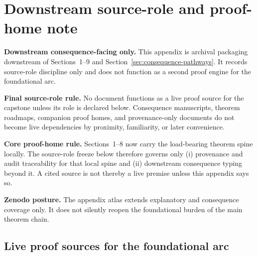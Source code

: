 \section{Downstream source-role and proof-home note}
\label{app:final-source-freeze}

\begin{fixedbox}
\textbf{Downstream consequence-facing only.} This appendix is archival packaging downstream of Sections~1--9 and Section~\ref{sec:consequence-pathways}. It records source-role discipline only and does not function as a second proof engine for the foundational arc.\par\medskip
\textbf{Final source-role rule.} No document functions as a live proof source for the capstone unless its role is declared below. Consequence manuscripts, theorem roadmaps, companion proof homes, and provenance-only documents do not become live dependencies by proximity, familiarity, or later convenience.\par\medskip
\textbf{Core proof-home rule.} Sections~1--8 now carry the load-bearing theorem spine locally. The source-role freeze below therefore governs only (i) provenance and audit traceability for that local spine and (ii) downstream consequence typing beyond it. A cited source is not thereby a live premise unless this appendix says so.\par\medskip
\textbf{Zenodo posture.} The appendix atlas extends explanatory and consequence coverage only. It does not silently reopen the foundational burden of the main theorem chain.
\end{fixedbox}

\subsection*{Live proof sources for the foundational arc}

